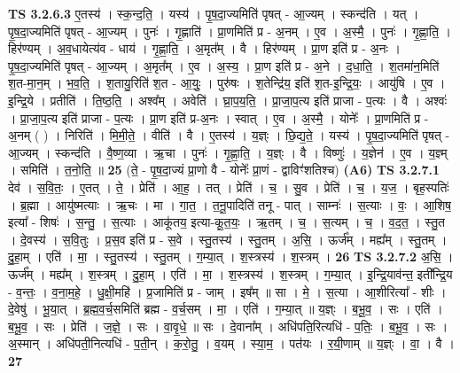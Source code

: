 \documentclass[17pt]{extarticle}
\begin{document}
                  \newline
                                \textbf{ TS 3.2.6.3} \newline
                  ए॒तस्य॑ । स्क॒न्द॒ति॒ । यस्य॑ । पृ॒ष॒दा॒ज्यमिति॑ पृषत् - आ॒ज्यम् । स्कन्द॑ति । यत् । पृ॒ष॒दा॒ज्यमिति॑ पृषत् - आ॒ज्यम् । पुनः॑ । गृ॒ह्णाति॑ । प्रा॒णमिति॑ प्र - अ॒नम् । ए॒व । अ॒स्मै॒ । पुनः॑ । गृ॒ह्णा॒ति॒ । हिर॑ण्यम् । अ॒व॒धायेत्य॑व - धाय॑ । गृ॒ह्णा॒ति॒ । अ॒मृत᳚म् । वै । हिर॑ण्यम् । प्रा॒ण इति॑ प्र - अ॒नः । पृ॒ष॒दा॒ज्यमिति॑ पृषत् - आ॒ज्यम् । अ॒मृत᳚म् । ए॒व । अ॒स्य॒ । प्रा॒ण इति॑ प्र - अ॒ने । द॒धा॒ति॒ । श॒तमा॑न॒मिति॑ श॒त-मा॒न॒म् । भ॒व॒ति॒ । श॒तायु॒रिति॑ श॒त - आ॒युः॒ । पुरु॑षः । श॒तेन्द्रि॑य॒ इति॑ श॒त-इ॒न्द्रि॒यः॒ । आयु॑षि । ए॒व । इ॒न्द्रि॒ये । प्रतीति॑ । ति॒ष्ठ॒ति॒ । अश्व᳚म् । अवेति॑ । घ्रा॒प॒य॒ति॒ । प्रा॒जा॒प॒त्य इति॑ प्राजा - प॒त्यः । वै । अश्वः॑ । प्रा॒जा॒प॒त्य इति॑ प्राजा - प॒त्यः । प्रा॒ण इति॑ प्र-अ॒नः । स्वात् । ए॒व । अ॒स्मै॒ । योनेः᳚ । प्रा॒णमिति॑ प्र - अ॒नम् ( ) । निरिति॑ । मि॒मी॒ते॒ । वीति॑ । वै । ए॒तस्य॑ । य॒ज्ञ्ः । छि॒द्य॒ते॒ । यस्य॑ । पृ॒ष॒दा॒ज्यमिति॑ पृषत् - आ॒ज्यम् । स्कन्द॑ति । वै॒ष्ण॒व्या । ऋ॒चा । पुनः॑ । गृ॒ह्णा॒ति॒ । य॒ज्ञ्ः । वै । विष्णुः॑ । य॒ज्ञेन॑ । ए॒व । य॒ज्ञ्म् । समिति॑ । त॒नो॒ति॒ ॥ \textbf{  25} \newline
                  \newline
                      (ते॒ - पृ॒ष॒दा॒ज्यं प्रा॒णो वै - योनेः᳚ प्रा॒णं - द्वाविꣳ॑शतिश्च)  \textbf{(A6)} \newline \newline
                                \textbf{ TS 3.2.7.1} \newline
                  देव॑ । स॒वि॒तः॒ । ए॒तत् । ते॒ । प्रेति॑ । आ॒ह॒ । तत् । प्रेति॑ । च॒ । सु॒व । प्रेति॑ । च॒ । य॒ज॒ । बृह॒स्पतिः॑ । ब्र॒ह्मा । आयु॑ष्मत्याः । ऋ॒चः । मा । गा॒त॒ । त॒नू॒पादिति॑ तनू - पात् । साम्नः॑ । स॒त्याः । वः॒ । आ॒शिष॒ इत्या᳚ - शिषः॑ । स॒न्तु॒ । स॒त्याः । आकू॑तय॒ इत्या-कू॒त॒यः॒ । ऋ॒तम् । च॒ । स॒त्यम् । च॒ । व॒द॒त॒ । स्तु॒त । दे॒वस्य॑ । स॒वि॒तुः । प्र॒स॒व इति॑ प्र - स॒वे । स्तु॒तस्य॑ । स्तु॒तम् । अ॒सि॒ । ऊर्ज᳚म् । मह्य᳚म् । स्तु॒तम् । दु॒हा॒म् । एति॑ । मा॒ । स्तु॒तस्य॑ । स्तु॒तम् । ग॒म्या॒त् । श॒स्त्रस्य॑ । श॒स्त्रम् । \textbf{  26} \newline
                  \newline
                                \textbf{ TS 3.2.7.2} \newline
                  अ॒सि॒ । ऊर्ज᳚म् । मह्य᳚म् । श॒स्त्रम् । दु॒हा॒म् । एति॑ । मा॒ । श॒स्त्रस्य॑ । श॒स्त्रम् । ग॒म्या॒त् । इ॒न्द्रि॒याव॑न्त॒ इती᳚न्द्रि॒य - व॒न्तः॒ । व॒ना॒म॒हे॒ । धु॒क्षी॒महि॑ । प्र॒जामिति॑ प्र - जाम् । इष᳚म् ॥ सा । मे॒ । स॒त्या । आ॒शीरित्या᳚ - शीः । दे॒वेषु॑ । भू॒या॒त् । ब्र॒ह्म॒व॒र्च॒समिति॑ ब्रह्म - व॒र्च॒सम् । मा॒ । एति॑ । ग॒म्या॒त् ॥ य॒ज्ञ्ः । ब॒भू॒व॒ । सः । एति॑ । ब॒भू॒व॒ । सः । प्रेति॑ । ज॒ज्ञे॒ । सः । वा॒वृ॒धे॒ ॥ सः । दे॒वाना᳚म् । अधि॑पति॒रित्यधि॑ - प॒तिः॒ । ब॒भू॒व॒ । सः । अ॒स्मान् । अधि॑पती॒नित्यधि॑ - प॒ती॒न् । क॒रो॒तु॒ । व॒यम् । स्या॒म॒ । पत॑यः । र॒यी॒णाम् ॥ य॒ज्ञ्ः । वा॒ । वै । \textbf{  27} \newline
\end{document}
